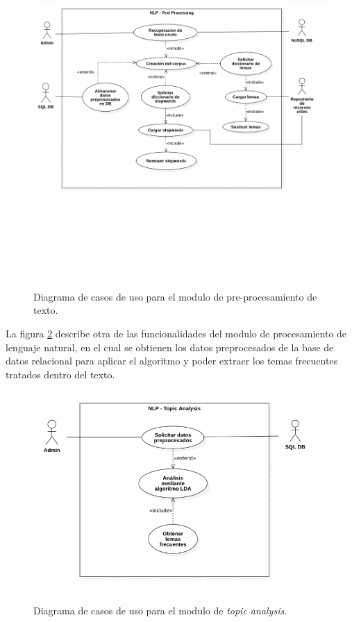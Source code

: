         \begin{figure}[H]
             \centering
             \includegraphics[height=14cm, width=16.5cm]{Latex/Classes/Imagenes/NLP_Text_Processing.png}
             \caption{Diagrama de casos de uso para el modulo de pre-procesamiento de texto.}
             \label{fig:cu-nlp-tp}
        \end{figure}
        La figura \ref{fig:cu-nlp-ta} describe otra de las funcionalidades del modulo de procesamiento de lenguaje natural, en el cual se obtienen los datos preprocesados de la base de datos relacional para aplicar el algoritmo  y poder extraer los temas frecuentes tratados dentro del texto.
        \begin{figure}[H]
             \centering
             \includegraphics[height=8cm, width=16.5cm]{Latex/Classes/Imagenes/NLP_Topic_Analysis.png}
             \caption{Diagrama de casos de uso para el modulo de \textit{topic analysis}.}
             \label{fig:cu-nlp-ta}
        \end{figure}
